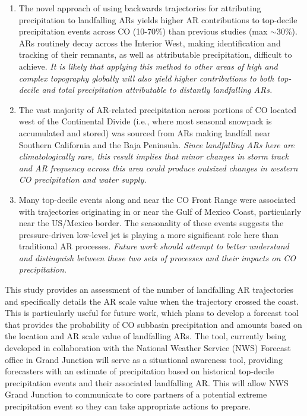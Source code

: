 \documentclass[draft]{agujournal2019}
\begin{document}
\begin{enumerate}
  \item The novel approach of using backwards trajectories for attributing precipitation to landfalling ARs yields higher AR contributions to top-decile precipitation events across CO (10-70\%) than previous studies (max $\sim$30\%). ARs routinely decay across the Interior West, making identification and tracking of their remnants, as well as attributable precipitation, difficult to achieve. \textit{It is likely that applying this method to other areas of high and complex topography globally will also yield higher contributions to both top-decile and total precipitation attributable to distantly landfalling ARs.}
  \item The vast majority of AR-related precipitation across portions of CO located west of the Continental Divide (i.e., where most seasonal snowpack is accumulated and stored) was sourced from ARs making landfall near Southern California and the Baja Peninsula. \textit{Since landfalling ARs here are climatologically rare, this result implies that minor changes in storm track and AR frequency across this area could produce outsized changes in western CO precipitation and water supply.}
  \item Many top-decile events along and near the CO Front Range were associated with trajectories originating in or near the Gulf of Mexico Coast, particularly near the US/Mexico border. The seasonality of these events suggests the pressure-driven low-level jet is playing a more significant role here than traditional AR processes. \textit{Future work should attempt to better understand and distinguish between these two sets of processes and their impacts on CO precipitation.}
\end{enumerate}

This study provides an assessment of the number of landfalling AR trajectories and specifically details the AR scale \cite{MartinRalph2019} value when the trajectory crossed the coast. This is particularly useful for future work, which plans to develop a forecast tool that provides the probability of CO subbasin precipitation and amounts based on the location and AR scale value of landfalling ARs. The tool, currently being developed in collaboration with the National Weather Service (NWS) Forecast office in Grand Junction will serve as a situational awareness tool, providing forecasters with an estimate of precipitation based on historical top-decile precipitation events and their associated landfalling AR. This will allow NWS Grand Junction to communicate to core partners of a potential extreme precipitation event so they can take appropriate actions to prepare.
\end{document}
